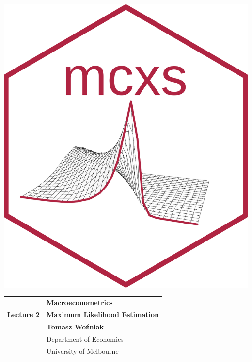 \documentclass[notes,blackandwhite,mathsans]{beamer}
\begin{document}



\begin{frame}
\centering\includegraphics[scale=1.87]{mcxs.png}
\end{frame}





{
\begin{frame}

\vspace{1cm}
\begin{tabular}{rl}
&\textbf{\LARGE\color{mcxs1} Macroeconometrics}\\[8ex]
\textbf{\Large Lecture 2}&\textbf{\Large\color{mcxs5}Maximum Likelihood Estimation}\\[19ex]
&\textbf{Tomasz Wo\'zniak}\\[1ex]
&{\small\color{mcxs5} Department of Economics}\\
&{\small\color{mcxs5}University of Melbourne}
\end{tabular}

\end{frame}
}
\end{document}
